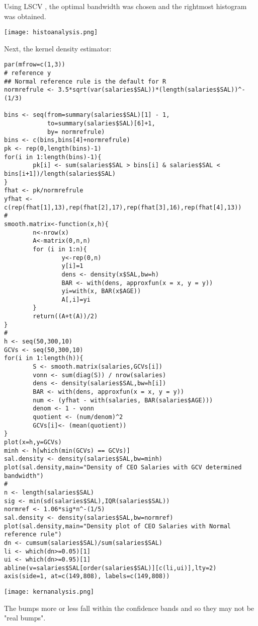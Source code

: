 \documentclass[11pt]{report}
\begin{document}
Using LSCV , the optimal bandwidth was chosen and the rightmost histogram was obtained.

\texttt{[image: histoanalysis.png]}

Next, the kernel density estimator:
\begin{verbatim}
par(mfrow=c(1,3))
# reference y
## Normal reference rule is the default for R
normrefrule <- 3.5*sqrt(var(salaries$SAL))*(length(salaries$SAL))^-(1/3)

bins <- seq(from=summary(salaries$SAL)[1] - 1,
            to=summary(salaries$SAL)[6]+1,
            by= normrefrule)
bins <- c(bins,bins[4]+normrefrule)
pk <- rep(0,length(bins)-1)
for(i in 1:length(bins)-1){
        pk[i] <- sum(salaries$SAL > bins[i] & salaries$SAL < bins[i+1])/length(salaries$SAL)
}
fhat <- pk/normrefrule
yfhat <- c(rep(fhat[1],13),rep(fhat[2],17),rep(fhat[3],16),rep(fhat[4],13))
#
smooth.matrix<-function(x,h){
        n<-nrow(x)
        A<-matrix(0,n,n)
        for (i in 1:n){
                y<-rep(0,n)
                y[i]=1
                dens <- density(x$SAL,bw=h)
                BAR <- with(dens, approxfun(x = x, y = y))
                yi=with(x, BAR(x$AGE))
                A[,i]=yi
        }
        return((A+t(A))/2)
}
#
h <- seq(50,300,10)
GCVs <- seq(50,300,10)
for(i in 1:length(h)){
        S <- smooth.matrix(salaries,GCVs[i])
        vonn <- sum(diag(S)) / nrow(salaries)
        dens <- density(salaries$SAL,bw=h[i])
        BAR <- with(dens, approxfun(x = x, y = y))
        num <- (yfhat - with(salaries, BAR(salaries$AGE)))
        denom <- 1 - vonn
        quotient <- (num/denom)^2
        GCVs[i]<- (mean(quotient))
}
plot(x=h,y=GCVs)
minh <- h[which(min(GCVs) == GCVs)]
sal.density <- density(salaries$SAL,bw=minh)
plot(sal.density,main="Density of CEO Salaries with GCV determined bandwidth")
#
n <- length(salaries$SAL)
sig <- min(sd(salaries$SAL),IQR(salaries$SAL))
normref <- 1.06*sig*n^-(1/5)
sal.density <- density(salaries$SAL,bw=normref)
plot(sal.density,main="Density plot of CEO Salaries with Normal reference rule")
dn <- cumsum(salaries$SAL)/sum(salaries$SAL)
li <- which(dn>=0.05)[1]
ui <- which(dn>=0.95)[1]
abline(v=salaries$SAL[order(salaries$SAL)][c(li,ui)],lty=2)
axis(side=1, at=c(149,808), labels=c(149,808))
\end{verbatim}

\texttt{[image: kernanalysis.png]}

The bumps more or less fall within the confidence bands and so they may not be "real bumps".
\end{document}

